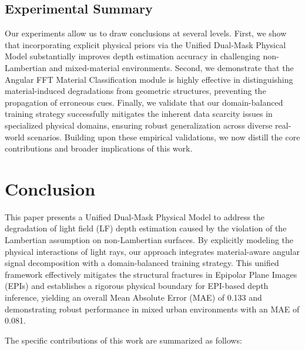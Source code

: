 \documentclass[lettersize,journal]{IEEEtran}
\begin{document}
\subsection{Experimental Summary}

Our experiments allow us to draw conclusions at several levels. First, we show that incorporating explicit physical priors via the Unified Dual-Mask Physical Model substantially improves depth estimation accuracy in challenging non-Lambertian and mixed-material environments. Second, we demonstrate that the Angular FFT Material Classification module is highly effective in distinguishing material-induced degradations from geometric structures, preventing the propagation of erroneous cues. Finally, we validate that our domain-balanced training strategy successfully mitigates the inherent data scarcity issues in specialized physical domains, ensuring robust generalization across diverse real-world scenarios. Building upon these empirical validations, we now distill the core contributions and broader implications of this work.

\section{Conclusion}

This paper presents a Unified Dual-Mask Physical Model to address the degradation of light field (LF) depth estimation caused by the violation of the Lambertian assumption on non-Lambertian surfaces. By explicitly modeling the physical interactions of light rays, our approach integrates material-aware angular signal decomposition with a domain-balanced training strategy. This unified framework effectively mitigates the structural fractures in Epipolar Plane Images (EPIs) and establishes a rigorous physical boundary for EPI-based depth inference, yielding an overall Mean Absolute Error (MAE) of 0.133 and demonstrating robust performance in mixed urban environments with an MAE of 0.081.

The specific contributions of this work are summarized as follows:
\end{document}
